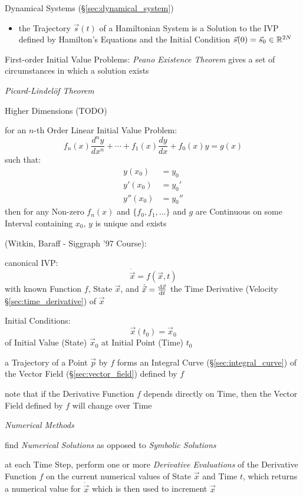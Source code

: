 {\fist Dynamical Systems (\S\ref{sec:dynamical_system})

\begin{itemize}
  \item the Trajectory $\vec{s}(t)$ of a Hamiltonian System is a Solution to
    the IVP defined by Hamilton's Equations and the Initial Condition
    $\vec{s}(0) = \vec{s}_0 \in \mathbb{R}^{2N}$
\end{itemize}

First-order Initial Value Problems: \emph{Peano Existence Theorem} gives a set
of circumstances in which a solution exists

\emph{Picard-Lindel\"of Theorem}

Higher Dimensions (TODO)

for an $n$-th Order Linear Initial Value Problem:
\[
  f_n(x)\frac{d^ny}{dx^n} + \cdots + f_1(x)\frac{dy}{dx} + f_0(x)y = g(x)
\]
such that:
\begin{align*}
  y(x_0)   & = y_0   \\
  y'(x_0)  & = y_0'  \\
  y''(x_0) & = y_0''
\end{align*}
then for any Non-zero $f_n(x)$ and $\{f_0,f_1,\ldots\}$ and $g$ are Continuous
on some Interval containing $x_0$, $y$ is unique and exists

(Witkin, Baraff - Siggraph '97 Course):

canonical IVP:
\[
  \dot{\vec{x}} = f(\vec{x}, t)
\]
with known Function $f$, State $\vec{x}$, and $\dot{\vec{x}} =
\frac{\mathrm{d}\vec{x}}{\mathrm{d}t}$ the Time Derivative (Velocity \S\ref{sec:time_derivative})
of $\vec{x}$

Initial Conditions:
\[
  \vec{x}(t_0) = \vec{x}_0
\]
of Initial Value (State) $\vec{x}_0$ at Initial Point (Time) $t_0$

a Trajectory of a Point $\vec{p}$ by $f$ forms an Integral Curve
(\S\ref{sec:integral_curve}) of the Vector Field (\S\ref{sec:vector_field})
defined by $f$

note that if the Derivative Function $f$ depends directly on Time, then the
Vector Field defined by $f$ will change over Time

\emph{Numerical Methods}

find \emph{Numerical Solutions} as opposed to \emph{Symbolic Solutions}

at each Time Step, perform one or more \emph{Derivative Evaluations} of the
Derivative Function $f$ on the current numerical values of State $\vec{x}$ and
Time $t$, which returns a numerical value for $\dot{\vec{x}}$ which is then used
to increment $\vec{x}$

}
